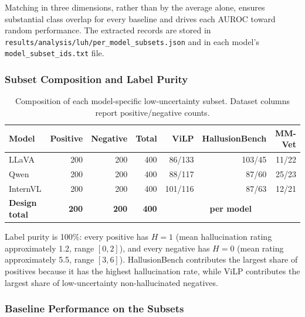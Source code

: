 Matching in three dimensions, rather than by the average alone, ensures substantial class overlap for every baseline and drives each AUROC toward random performance. The extracted records are stored in \texttt{results/analysis/luh/per\_model\_subsets.json} and in each model's \texttt{model\_subset\_ids.txt} file.

\subsubsection{Subset Composition and Label Purity}

\begin{table}[H]
\centering
\caption{Composition of each model-specific low-uncertainty subset. Dataset columns report positive/negative counts.}
\label{tab:subset_composition}
\small
\setlength{\tabcolsep}{7pt}
\renewcommand{\arraystretch}{1.18}
\begin{tabular}{@{}lrrrrrr@{}}
\toprule
\textbf{Model} & \textbf{Positive} & \textbf{Negative} & \textbf{Total} & \textbf{ViLP} & \textbf{HallusionBench} & \textbf{MM-Vet} \\
\midrule
LLaVA & 200 & 200 & 400 & 86/133 & 103/45 & 11/22 \\
Qwen & 200 & 200 & 400 & 88/117 & 87/60 & 25/23 \\
InternVL & 200 & 200 & 400 & 101/116 & 87/63 & 12/21 \\
\rowcolor{gray!12} \textbf{Design total} & \textbf{200} & \textbf{200} & \textbf{400} & \multicolumn{3}{c}{\textbf{per model}} \\
\bottomrule
\end{tabular}
\end{table}

Label purity is 100\%: every positive has $H=1$ (mean hallucination rating approximately 1.2, range $[0,2]$), and every negative has $H=0$ (mean rating approximately 5.5, range $[3,6]$). HallusionBench contributes the largest share of positives because it has the highest hallucination rate, while ViLP contributes the largest share of low-uncertainty non-hallucinated negatives.

\subsubsection{Baseline Performance on the Subsets}


